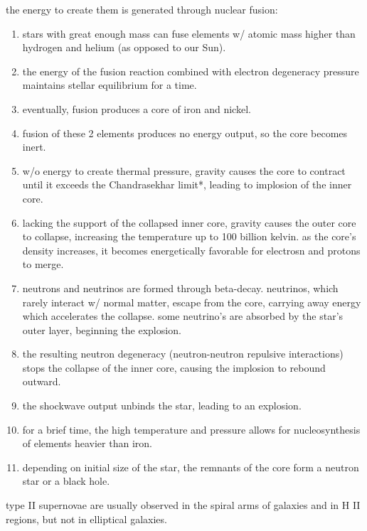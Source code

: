 the energy to create them is generated through nuclear fusion:
\begin{enumerate}
	\item stars with great enough mass can fuse elements w/ atomic mass higher than hydrogen and helium (as opposed to our Sun).
	\item the energy of the fusion reaction combined with electron degeneracy pressure maintains stellar equilibrium for a time.
	\item eventually, fusion produces a core of iron and nickel.
	\item fusion of these 2 elements produces no energy output, so the core becomes inert.
	\item w/o energy to create thermal pressure, gravity causes the core to contract until it exceeds the \gls{Chandrasekhar limit}*, leading to implosion of the inner core.
	\item lacking the support of the collapsed inner core, gravity causes the outer core to collapse, increasing the temperature up to 100 billion kelvin. as the core's density increases, it becomes energetically favorable for electrosn and protons to merge.
	\item neutrons and neutrinos are formed through beta-decay. neutrinos, which rarely interact w/ normal matter, escape from the core, carrying away energy which accelerates the collapse. some neutrino's are absorbed by the star's outer layer, beginning the explosion.
	\item the resulting neutron degeneracy (neutron-neutron repulsive interactions) stops the collapse of the inner core, causing the implosion to rebound outward.
	\item the shockwave output unbinds the star, leading to an explosion.
	\item for a brief time, the high temperature and pressure allows for nucleosynthesis of elements heavier than iron.
	\item depending on initial size of the star, the remnants of the core form a neutron star or a black hole.
\end{enumerate}
type II supernovae are usually observed in the spiral arms of galaxies and in H II regions, but not in elliptical galaxies.

